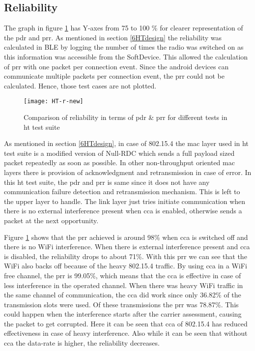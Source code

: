 \subsection{Reliability}
The graph in figure \ref{fig:HT-r} has Y-axes from 75 to 100 \% for clearer representation of the \gls{pdr} and \gls{prr}. As mentioned in section \ref{6HTdesign} the reliability was calculated in BLE by logging the number of times the radio was switched on as this information was accessible from the SoftDevice. This allowed the calculation of \gls{prr} with one packet per connection event. Since the android devices can communicate multiple packets per connection event, the \gls{prr} could not be calculated. Hence, those test cases are not plotted.

\begin{figure}[tb]
\texttt{[image: HT-r-new]}
\caption{Comparison of reliability in terms of \gls{pdr} \& \gls{prr} for different tests in \gls{ht} test suite }
\label{fig:HT-r}
\vspace{-6 pt}
\end{figure}

As mentioned in section \ref{6HTdesign}, in case of 802.15.4 the \gls{mac} layer used in \gls{ht} test suite is a modified version of Null-RDC which sends a full payload sized packet repeatedly as soon as possible. In other non-throughput oriented \gls{mac} layers there is provision of acknowledgment and retransmission in case of error. In this \gls{ht} test suite, the \gls{pdr} and \gls{prr} is same since it does not have any communication failure detection and retransmission mechanism. This is left to the upper layer to handle. The link layer just tries initiate communication when there is no external interference present when \gls{cca} is enabled, otherwise sends a packet at the next opportunity. 

Figure \ref{fig:HT-r} shows that the \gls{prr} achieved is around 98\% when \gls{cca} is switched off and there is no WiFi interference. When there is external interference present and \gls{cca} is disabled, the reliability drops to about 71\%. With this \gls{prr} we can see that the WiFi also backs off because of the heavy 802.15.4 traffic. By using \gls{cca} in a WiFi free channel, the \gls{prr} is 99.05\%, which means that the \gls{cca} is effective in case of less interference in the operated channel. When there was heavy WiFi traffic in the same channel of communication, the \gls{cca} did work since only 36.82\% of the transmission slots were used. Of these transmissions the \gls{prr} was 78.87\%. This could happen when the interference starts after the carrier assessment, causing the packet to get corrupted. Here it can be seen that \gls{cca} of 802.15.4 has reduced effectiveness in case of heavy interference. Also while it can be seen that without \gls{cca} the data-rate is higher, the reliability decreases.

